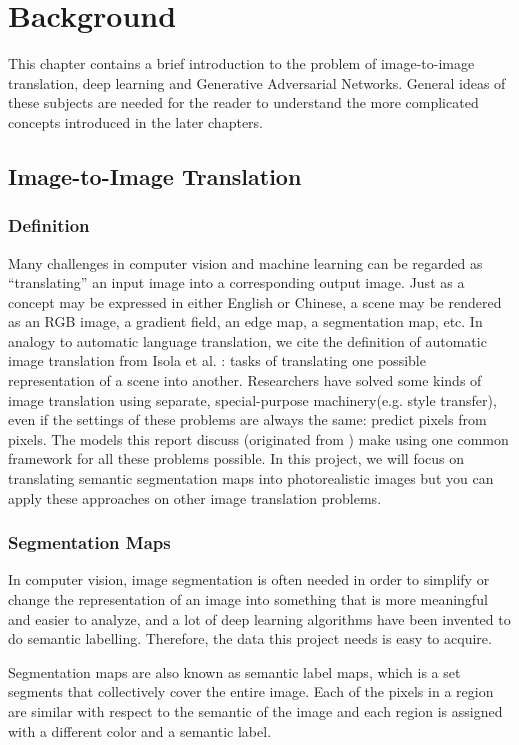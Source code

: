 \chapter{Background}
\label{cha:intro}
This chapter contains a brief introduction to the problem of image-to-image translation,
deep learning and Generative Adversarial Networks. General ideas of these subjects
are needed for the reader to understand the more complicated concepts introduced in the later
chapters.

\section{Image-to-Image Translation}
\subsection{Definition}
Many challenges in computer vision and machine learning can be regarded as “translating” an 
input image into a corresponding output image. Just as a concept may be expressed in either 
English or Chinese, a scene may be rendered as an RGB image, a gradient field, an edge map, 
a segmentation map, etc. In analogy to automatic language translation, we cite the definition
of automatic image translation from Isola et al. \cite{pix2pix2016}: tasks of translating one 
possible representation of a scene into another. Researchers have solved some kinds of image 
translation using separate, special-purpose machinery(e.g. style transfer\cite{gatys2015neural}),
even if the settings of these problems are always the same: predict pixels from pixels.
The models this report discuss (originated from \cite{pix2pix2016})
make using one common framework for all these problems possible.
In this project, we will focus on translating 
semantic segmentation maps into photorealistic images but you can apply these approaches on
other image translation problems.

\subsection{Segmentation Maps}
In computer vision, image segmentation is often needed in order to simplify or change 
the representation of an image into something that is more meaningful and easier to analyze, 
and a lot of deep learning algorithms have been invented to do semantic labelling. Therefore,
the data this project needs is easy to acquire.

Segmentation maps are also known as semantic label maps, which is a set segments that
collectively cover the entire image. Each of the pixels in a region are similar with 
respect to the semantic of the image and each region is assigned with a different 
color and a semantic label.

